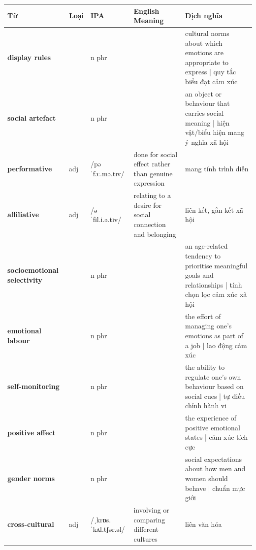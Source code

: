 \vspace{0.8em}
\begin{center}
\renewcommand{\arraystretch}{1.65}
\begin{tabularx}{\textwidth}{|V{0.22\textwidth}|C{0.07\textwidth}|I{0.20\textwidth}|Y|V{0.18\textwidth}|}
\hline
{}
\textbf{Từ} & \textbf{Loại} & \textbf{IPA} & \textbf{English Meaning} & \textbf{Dịch nghĩa} \\
\hline
\textbf{display rules} & & n phr & & cultural norms about which emotions are appropriate to express | quy tắc biểu đạt cảm xúc \\ \hline
\textbf{social artefact} & & n phr & & an object or behaviour that carries social meaning | hiện vật/biểu hiện mang ý nghĩa xã hội \\ \hline
\textbf{performative} & adj & /pəˈfɔː.mə.tɪv/ & done for social effect rather than genuine expression & mang tính trình diễn \\ \hline
\textbf{affiliative} & adj & /əˈfɪl.i.ə.tɪv/ & relating to a desire for social connection and belonging & liên kết, gắn kết xã hội \\ \hline
\textbf{socioemotional selectivity} & & n phr & & an age-related tendency to prioritise meaningful goals and relationships | tính chọn lọc cảm xúc xã hội \\ \hline
\textbf{emotional labour} & & n phr & & the effort of managing one's emotions as part of a job | lao động cảm xúc \\ \hline
\textbf{self-monitoring} & & n phr & & the ability to regulate one's own behaviour based on social cues | tự điều chỉnh hành vi \\ \hline
\textbf{positive affect} & & n phr & & the experience of positive emotional states | cảm xúc tích cực \\ \hline
\textbf{gender norms} & & n phr & & social expectations about how men and women should behave | chuẩn mực giới \\ \hline
\textbf{cross-cultural} & adj & /ˌkrɒs.ˈkʌl.tʃər.əl/ & involving or comparing different cultures & liên văn hóa \\ \hline
\end{tabularx}
\end{center}

\newpage

